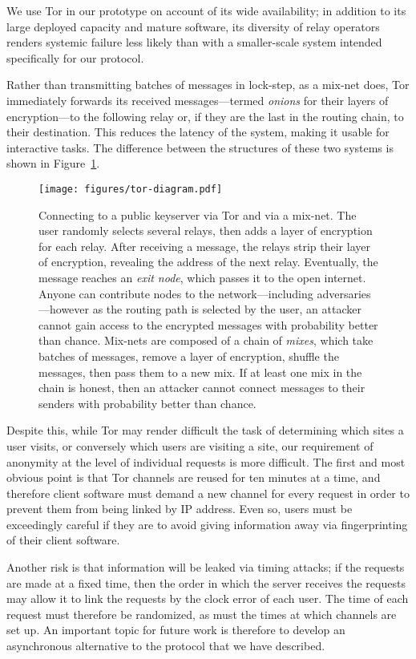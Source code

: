\documentclass[USenglish]{llncs}
\begin{document}
We use Tor in our prototype on account of its wide availability; in addition to its large
deployed capacity and mature software, its diversity of relay operators
renders systemic failure less likely than with a smaller-scale system intended
specifically for our protocol.

Rather than transmitting batches of messages in lock-step, as a mix-net
does, Tor immediately forwards its received messages---termed
\emph{onions} for their layers of encryption---to the following relay
or, if they are the last in the routing chain, to their destination.  This
reduces the latency of the system, making it usable for interactive tasks.
The difference between the structures of these two systems is shown in
Figure~\ref{fig:tor-public}.
\begin{figure}
	\centering
	\texttt{[image: figures/tor-diagram.pdf]}
	\caption{Connecting to a public keyserver via Tor and via a mix-net.
			The user randomly selects
			several relays, then adds a layer of encryption for each relay.
			After receiving a message, the relays strip their layer of encryption,
			revealing the address of the next relay.  Eventually, the message
			reaches an \emph{exit node}, which passes it to the open
			internet.
			Anyone can contribute nodes to the network---including
			adversaries---however as the routing path is selected by
			the user, an attacker cannot gain access to the encrypted
			messages with probability better than chance.
			Mix-nets are composed of a chain of \emph{mixes}, which
			take batches of messages, remove a layer of encryption,
			shuffle the messages, then pass them to a new mix.  If at least
			one mix in the chain is honest, then an attacker cannot connect
			messages to their senders with probability better than chance.}
	\label{fig:tor-public}
\end{figure}

Despite this, while Tor may render difficult the task of determining
which sites a user visits, or conversely which users are visiting a site,
our requirement of anonymity at the level of individual requests is more
difficult.  The first and most obvious point is that Tor channels are reused
for ten minutes at a time, and therefore client software must demand
a new channel for every request in order to prevent them from being linked
by IP address.  Even so, users must be exceedingly careful if
they are to avoid giving information away via fingerprinting of their
client software.

Another risk is that information will be leaked via timing attacks; if the requests
are made at a fixed time, then the order in which the server receives the
requests may allow it to link the requests by the clock error of each
user.  The time of each request must therefore be randomized,
as must the times at which channels are set up.  An important topic for
future work is therefore to develop an asynchronous alternative
to the protocol that we have described.
\end{document}
